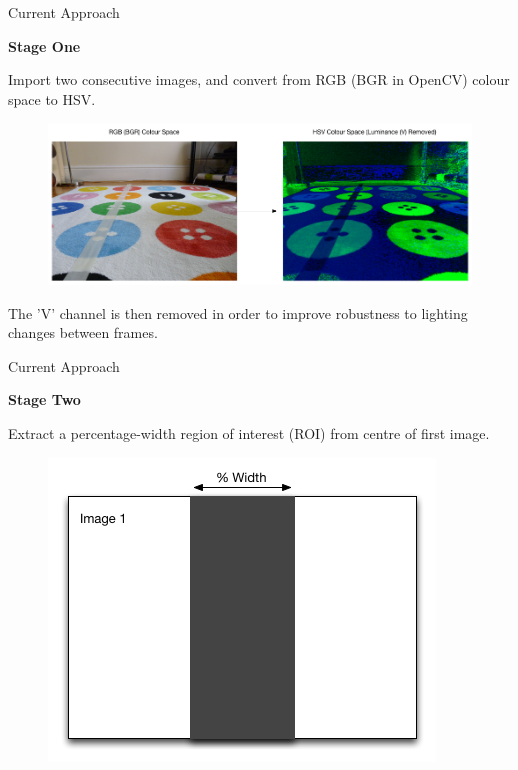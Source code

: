 \documentclass[10pt, compress]{beamer}
\begin{document}
\begin{frame}{Current Approach}


\textbf{Stage One} \\ \vspace{0.2cm}

Import two consecutive images, and convert from RGB (BGR in OpenCV) colour space to HSV.

\begin{figure}[ht!]
\centering
\includegraphics[scale=0.26]{rgb2hsv.png}
  \end{figure}
  
The 'V' channel is then removed in order to improve robustness to lighting changes between frames. 
\end{frame}

\begin{frame}{Current Approach}

\textbf{Stage Two} \\ \vspace{0.2cm}

Extract a percentage-width region of interest (ROI) from centre of first image.

\begin{figure}[ht!]
\centering
\includegraphics[scale=0.5]{stage1.png}
  \end{figure}
  
\end{frame}
\end{document}
